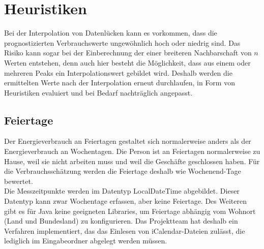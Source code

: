 \section{Heuristiken}
Bei der Interpolation von Datenlücken kann es vorkommen, dass die prognostizierten Verbrauchswerte ungewöhnlich hoch oder niedrig sind. Das Risiko kann sogar bei der Einberechnung der einer breiteren Nachbarschaft von $n$ Werten entstehen, denn auch hier besteht die Möglichkeit, dass aus einem oder mehreren Peaks ein Interpolationswert gebildet wird. Deshalb werden die ermittelten Werte nach der Interpolation erneut durchlaufen, in Form von Heuristiken evaluiert und bei Bedarf nachträglich angepasst.

\subsection{Feiertage}
Der Energieverbrauch an Feiertagen gestaltet sich normalerweise anders als der Energieverbrauch an Wochentagen. Die Person ist an Feiertagen normalerweise zu Hause, weil sie nicht arbeiten muss und weil die Geschäfte geschlossen haben. Für die Verbrauchsschätzung werden die Feiertage deshalb wie Wochenend-Tage bewertet.\\
Die Messzeitpunkte werden im Datentyp LocalDateTime abgebildet. Dieser Datentyp kann zwar Wochentage erfassen, aber keine Feiertage. Des Weiteren gibt es für Java keine geeigneten Libraries, um Feiertage abhängig vom Wohnort (Land und Bundesland) zu konfigurieren. Das Projektteam hat deshalb ein Verfahren implementiert, das das Einlesen von iCalendar-Dateien zulässt, die lediglich im Eingabeordner abgelegt werden müssen.

